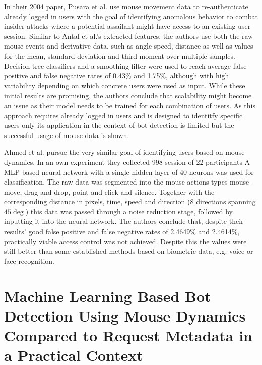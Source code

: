 \documentclass[
    fontsize=12pt,
    headings=small,
    parskip=half,           %
    bibliography=totoc,
    numbers=noenddot,       %
    open=any,               %
    final,                   %
    table
]{scrreprt}
\begin{document}
In their 2004 paper, Pusara et al. \cite{10.1145/1029208.1029210} use mouse movement data to re-authenticate already logged in users with the goal of identifying anomalous behavior to combat insider attacks where a potential assailant might have access to an existing user session. Similar to Antal et al.'s \cite{https://doi.org/10.1049/iet-bmt.2018.5126} extracted features, the authors use both the raw mouse events and derivative data, such as angle speed, distance as well as values for the mean, standard deviation and third moment over multiple samples. Decision tree classifiers and a smoothing filter were used to reach average false positive and false negative rates of 0.43\% and 1.75\%, although with high variability depending on which concrete users were used as input. While these initial results are promising, the authors conclude that scalability might become an issue as their model needs to be trained for each combination of users. As this approach requires already logged in users and is designed to identitfy specific users only its application in the context of bot detection is limited but the successful usage of mouse data is shown.

Ahmed et al. pursue the very similar goal of identifying users based on mouse dynamics. In an own experiment they collected 998 session of 22 participants
A MLP-based neural network with a single hidden layer of 40 neurons was used for classification. The raw data was segmented into the mouse actions types mouse-move, drag-and-drop, point-and-click and silence. Together with the corresponding distance in pixels, time, speed and direction (8 directions spanning $45\deg$) this data was passed through a noise reduction stage, followed by inputting it into the neural network. The authors conclude that, despite their results' good false positive and false negative rates of 2.4649\% and 2.4614\%, practically viable access control was not achieved. Despite this the values were still better than some established methods based on biometric data, e.g. voice or face recognition.


\chapter{Machine Learning Based Bot Detection Using Mouse Dynamics Compared to Request Metadata in a Practical Context}
\end{document}
